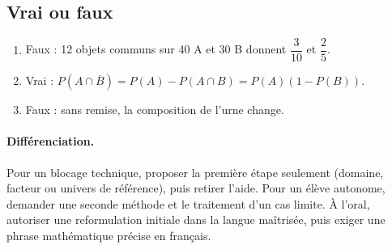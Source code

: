 \subsection*{Vrai ou faux}
\begin{enumerate}
\item Faux : 12 objets communs sur 40 A et 30 B donnent $\dfrac{3}{10}$ et $\dfrac{2}{5}$.
\item Vrai : $P(A\cap\overline B)=P(A)-P(A\cap B)=P(A)(1-P(B))$.
\item Faux : sans remise, la composition de l’urne change.
\end{enumerate}
\paragraph{Différenciation.} Pour un blocage technique, proposer la première étape seulement (domaine, facteur ou univers de référence), puis retirer l’aide. Pour un élève autonome, demander une seconde méthode et le traitement d’un cas limite. À l’oral, autoriser une reformulation initiale dans la langue maîtrisée, puis exiger une phrase mathématique précise en français.
